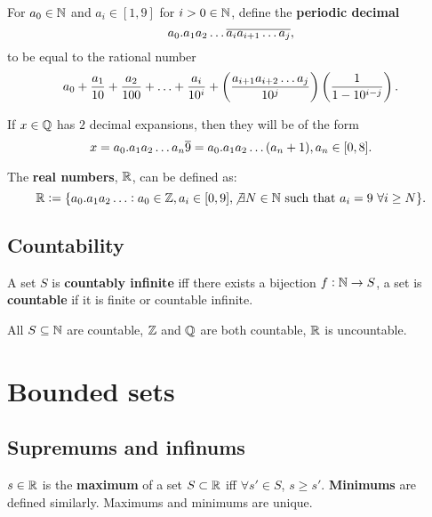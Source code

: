\documentclass[../Year1/Year1.tex]{subfiles}
\begin{document}
\begingroup\belowdisplayskip=-0pt

\begin{definition}
    For $a_0\in\mathbb{N}$ and $a_i\in[1,9]$ for $i>0\in\mathbb{N}$, define the \textbf{periodic decimal} \[
        a_0.a_1a_2\ldots\overline{a_ia_{i+1}\ldots a_j}
    \textcolor{black}{,}
    \] to be equal to the rational number \[
        a_0 + \frac{a_1}{10} + \frac{a_2}{100} + \ldots + \frac{a_i}{10^i} + \br{\frac{a_{i+1}a_{i+2}\ldots a_j}{10^j}}\br{\frac{1}{1-10^{i-j}}}
    \textcolor{black}{.}
    \]
\end{definition}

\endgroup
\begingroup\belowdisplayskip=-10pt

\begin{theorem}
    If $x\in\mathbb{Q}$ has $2$ decimal expansions, then they will be of the form \[
        x=a_0.a_1a_2\ldots a_n\overline{9} = a_0.a_1a_2\ldots(a_n+1), a_n\in[0,8]
    \textcolor{black}{.}    
    \]
\end{theorem}

\begin{definition}
    The \textbf{real numbers}, $\mathbb{R}$, can be defined as: \[
        \mathbb{R}:= \{a_0.a_1a_2\ldots : a_0\in\mathbb{Z}, a_i\in[0,9],\not\exists N\in\mathbb{N} \ \text{\textcolor{black}{such that }} a_i=9 \ \forall i\geq N\}
    \textcolor{black}{.}
    \]
\end{definition}

\endgroup

\subsection{Countability}

\begin{definition}[Countability]
    A set $S$ is \textbf{countably infinite} iff there exists a bijection $f:\mathbb{N}\rightarrow S$, a set is \textbf{countable} if it is finite or countable infinite.
\end{definition}

\begin{theorem}
    All $S\subseteq\mathbb{N}$ are countable, $\mathbb{Z}$ and $\mathbb{Q}$ are both countable, $\mathbb{R}$ is uncountable.
\end{theorem}

\section{Bounded sets}

\subsection{Supremums and infinums}
\begin{definition}
    $s\in\mathbb{R}$ is the \textbf{maximum} of a set $S\subset\mathbb{R}$ iff $\forall s'\in S$, $s\geq s'$. \textbf{Minimums} are defined similarly. Maximums and minimums are unique.
\end{definition}
\end{document}

